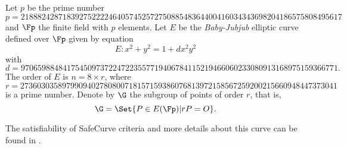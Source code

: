 Let $p$ be the prime number
$$	 {p = 218882428718392752222464057452572750885
			  48364400416034343698204186575808495617 } $$
and $\Fp$ the finite field with $p$ elements. 
%
Let $E$ be the {\it Baby-Jubjub} elliptic curve defined over $\Fp$ given %
by equation
$$	E: x^2 + y^2 = 1 +  d x^2 y^2 $$
with
$ d = 9706598848417545097372247223557719406784115219466060233080913168975159366771.$ 
The order of $E$ is $n = 8\times r$, where 
$$	r = 2736030358979909402780800718157159386076813972
		158567259200215660948447373041 $$ 
is a prime number. Denote by $\G$ the subgroup of points of order $r$, that is, %
$$\G = \Set{ P \in E(\Fp) | r P = O  }.$$
		
The satisfiability of SafeCurve %
criteria \cite{safe-curves} and more details about this curve can be found in %
\cite{github-barry}. 




